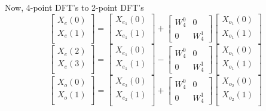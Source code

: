 \documentclass[journal,12pt,twocolumn]{IEEEtran}
\begin{document}
Now, 4-point DFT's to 2-point DFT's
\begin{equation}
\begin{bmatrix}
X_{e}(0) \\ 
X_{e}(1)\\ 
\end{bmatrix}
=
\begin{bmatrix}
X_{e_{1}}(0) \\ 
X_{e_{1}}(1)\\ 
\end{bmatrix}
+
\begin{bmatrix}
W^{0}_{4} & 0\\
0 & W^{1}_{4}
\end{bmatrix}
\begin{bmatrix}
X_{o_{1}}(0) \\ 
X_{o_{1}}(1) \\ 
\end{bmatrix}
\end{equation}
\begin{equation}
\begin{bmatrix}
X_{e}(2) \\ 
X_{e}(3)\\ 
\end{bmatrix}
=
\begin{bmatrix}
X_{e_{1}}(0) \\ 
X_{e_{1}}(1)\\ 
\end{bmatrix}
-
\begin{bmatrix}
W^{0}_{4} & 0\\
0 & W^{1}_{4}
\end{bmatrix}
\begin{bmatrix}
X_{o_{1}}(0) \\ 
X_{o_{1}}(1) \\ 
\end{bmatrix}
\end{equation}
\begin{equation}
\begin{bmatrix}
X_{o}(0) \\ 
X_{o}(1)\\ 
\end{bmatrix}
=
\begin{bmatrix}
X_{e_{2}}(0) \\ 
X_{e_{2}}(1)\\ 
\end{bmatrix}
+
\begin{bmatrix}
W^{0}_{4} & 0\\
0 & W^{1}_{4}
\end{bmatrix}
\begin{bmatrix}
X_{o_{2}}(0) \\ 
X_{o_{2}}(1) \\ 
\end{bmatrix}
\end{equation}
\end{document}
